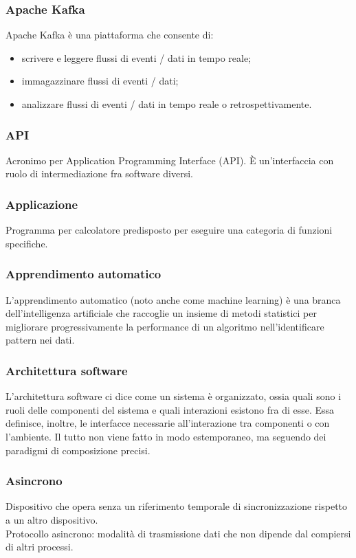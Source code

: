 \subsubsection*{Apache Kafka} Apache Kafka è una piattaforma che consente di:
\begin{itemize}
	\item scrivere e leggere flussi di eventi / dati in tempo reale;
	\item immagazzinare flussi di eventi / dati;
	\item analizzare flussi di eventi / dati in tempo reale o retrospettivamente.
\end{itemize}
\subsubsection*{API} Acronimo per Application Programming Interface (API). È un'interfaccia con ruolo di intermediazione fra software diversi.
\subsubsection*{Applicazione} Programma per calcolatore predisposto per eseguire una categoria di funzioni specifiche.
\subsubsection*{Apprendimento automatico} L’apprendimento automatico (noto anche come machine learning) è una branca dell'intelligenza artificiale che raccoglie un insieme di metodi statistici per migliorare progressivamente la performance di un algoritmo nell'identificare pattern nei dati.
\subsubsection*{Architettura software} L’architettura software ci dice come un sistema è organizzato, ossia quali sono i ruoli delle componenti del sistema e quali interazioni esistono fra di esse. Essa definisce, inoltre, le interfacce necessarie all’interazione tra componenti o con l’ambiente. Il tutto non viene fatto in modo estemporaneo, ma seguendo dei paradigmi di composizione precisi.
\subsubsection*{Asincrono} Dispositivo che opera senza un riferimento temporale di sincronizzazione rispetto a un altro dispositivo. \\
Protocollo asincrono: modalità di trasmissione dati che non dipende dal compiersi di altri processi.


